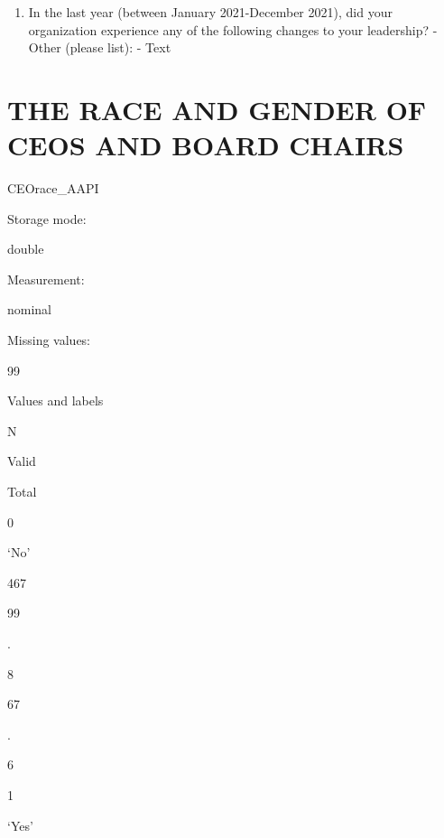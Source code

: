 \documentclass[
  letterpaper,
]{scrbook}
\providecommand{\tightlist}{%
  \setlength{\itemsep}{0pt}\setlength{\parskip}{0pt}}\usepackage{longtable,booktabs,array}
\begin{document}
\begin{enumerate}
\begin{enumerate}
\begin{enumerate}
\begin{enumerate}
\begin{enumerate}
\begin{enumerate}
\begin{enumerate}
\begin{enumerate}
\begin{enumerate}
\begin{enumerate}
                    \begin{enumerate}
                    \def\labelenumxi{\arabic{enumxi}.}
                    \tightlist
                    \item
                      In the last year (between January 2021-December
                      2021), did your organization experience any of the
                      following changes to your leadership? - Other
                      (please list): - Text
                    \end{enumerate}
                  \end{enumerate}
                \end{enumerate}
              \end{enumerate}
            \end{enumerate}
          \end{enumerate}
        \end{enumerate}
      \end{enumerate}
    \end{enumerate}
  \end{enumerate}
\end{enumerate}

\chapter{THE RACE AND GENDER OF CEOS AND BOARD
CHAIRS}\label{the-race-and-gender-of-ceos-and-board-chairs}

CEOrace\_AAPI

Storage mode:

double

Measurement:

nominal

Missing values:

99

Values and labels

N

Valid

Total

0

`No'

467

99

.

8

67

.

6

1

`Yes'
\end{document}
